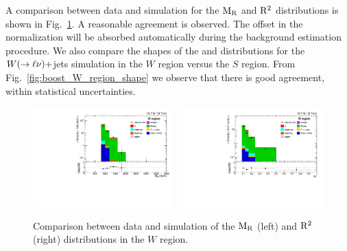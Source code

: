A comparison between data and simulation for the $\mathrm{M_R}$ and $\mathrm{R^2}$ distributions is shown in
Fig.~\ref{fig:boost_W_region_MR_Rsq}. A reasonable agreement is observed. The offset in the
normalization will be absorbed automatically during the background estimation procedure. 
We also compare the shapes of the \mr and \rsq distributions for the $W(\rightarrow\ell\nu)+$jets
simulation in the $W$ region versus the $S$ region. From Fig.~\ref{fig:boost_W_region_shape} we
observe that there is good agreement, within statistical uncertainties. 
 
\begin{figure}[htbp]
\centering
\includegraphics[width=0.48\textwidth]
{figures/razor_selection/plots/DataMC_MR_0Lbg1Y1LlmT_mdPhig0p5_width}
~
\includegraphics[width=0.48\textwidth]
{figures/razor_selection/plots/DataMC_R2_0Lbg1Y1LlmT_mdPhig0p5_width}
\caption{Comparison between data and simulation of the $\mathrm{M_R}$ (left) and $\mathrm{R^2}$ (right)
distributions in the $W$ region. 
\label{fig:boost_W_region_MR_Rsq}}
\end{figure}


